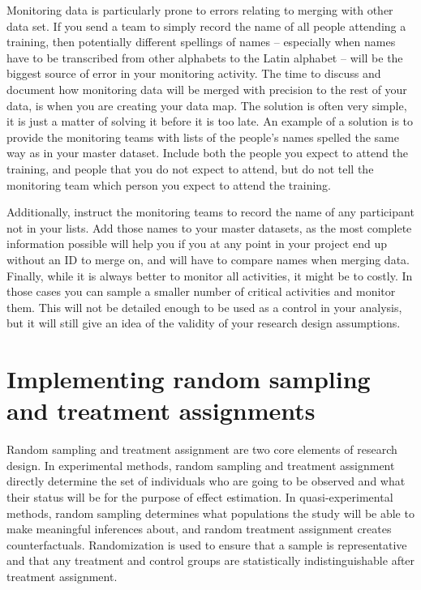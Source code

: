 Monitoring data is particularly prone to errors 
relating to merging with other data set. 
If you send a team to simply record the name of all people attending a training,
then potentially different spellings of names 
-- especially when names have to be transcribed from other alphabets to the Latin alphabet --
will be the biggest source of error in your monitoring activity.
The time to discuss and document how monitoring data will be merged with precision
to the rest of your data, is when you are creating your data map.
The solution is often very simple, it is just a matter of solving it before it is too late.
An example of a solution is to provide the monitoring teams 
with lists of the people's names spelled the same way as in your master dataset. 
Include both the people you expect to attend the training,
and people that you do not expect to attend,
but do not tell the monitoring team which person you expect to attend the training.

Additionally, instruct the monitoring teams to record the name of any
participant not in your lists. 
Add those names to your master datasets, 
as the most complete information possible will help you 
if you at any point in your project end up without an ID to merge on,
and will have to compare names when merging data.
Finally, while it is always better to monitor all activities,
it might be to costly. 
In those cases you can sample a smaller number of critical activities and monitor them.
This will not be detailed enough to be used as a control in your analysis,
but it will still give an idea of the validity of your research design assumptions.


\section{Implementing random sampling and treatment assignments}

Random sampling and treatment assignment are two core elements of research design.
In experimental methods, random sampling and treatment assignment directly determine
the set of individuals who are going to be observed
and what their status will be for the purpose of effect estimation.
In quasi-experimental methods, random sampling determines what populations the study
will be able to make meaningful inferences about,
and random treatment assignment creates counterfactuals.
Randomization 
is used to ensure that a sample is representative and
that any treatment and control groups are statistically indistinguishable
after treatment assignment.

